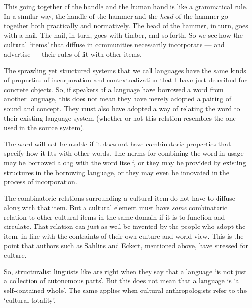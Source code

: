 This going together of the handle and the human hand is like a grammatical 
rule. In a similar way, the handle of the hammer and the \textit{head} of the 
hammer go together both 
practically and normatively. The head of the hammer, in turn, goes with a nail. The nail, in turn, goes with timber, and so forth. So we see how the cultural \textquoteleft items' 
that diffuse in communities necessarily 
incorporate --- and advertise --- their rules of fit with other items. 



The sprawling yet structured systems that we call languages have the same kinds of properties of incorporation and contextualization that I 
have just described for concrete objects. So, if speakers of a 
language have borrowed a word from another language, this does not mean they have 
merely adopted a pairing of sound and concept. They must also have adopted a way of relating the word to their existing language system 
(whether or not this relation resembles the one used in the source 
system). 



The word will not be usable if it does not have combinatoric properties that specify how it fits with other words. 
The norms for combining the word in usage may be borrowed along with the 
word itself, or they may be provided by existing structures in the borrowing 
language, or they may even be innovated in the process of incorporation. 



The combinatoric relations surrounding a cultural item 
do not have to diffuse along with that item. But a cultural 
element must have \textit{some} 
combinatoric relation to other cultural items in the same domain if it is to function and circulate. That relation can just as well be invented by the people who adopt the item, in line with the contraints of their own culture and world view. This 
is the point that authors such as Sahlins and Eckert, mentioned above, 
have stressed for culture.



So, structuralist linguists like \citet[1]{donegan_rhythm_1983} are right when they 
say that a language \textquoteleft is not just a collection of autonomous parts'. But
this does not mean that a language is \textquoteleft a self-contained 
whole'. The same applies when cultural anthropologists 
refer to the \textquoteleft cultural totality'. 



